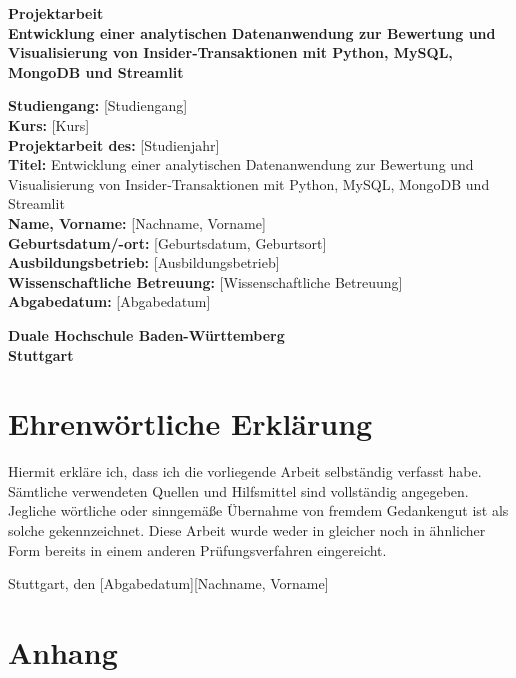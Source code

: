 \documentclass[a4paper,12pt]{article}
\newcommand{\makemercatorcover}{
  \begin{titlepage}
    \centering
    \vspace*{2cm}
    {\LARGE\textbf{Projektarbeit}}\\[1.5cm]
    {\Large\textbf{\placeholdertitle}}\\[3cm]
    \begin{flushleft}
    \textbf{Studiengang:} \placeholderstudiengang\\[0.5cm]
    \textbf{Kurs:} \placeholderkurs\\[0.5cm]
    \textbf{Projektarbeit des:} \placeholderstudienjahr\\[0.5cm]
    \textbf{Titel:} \placeholdertitle\\[0.5cm]
    \textbf{Name, Vorname:} \placeholdername\\[0.5cm]
    \textbf{Geburtsdatum/-ort:} \placeholderbirth\\[0.5cm]
    \textbf{Ausbildungsbetrieb:} \placeholdercompany\\[0.5cm]
    \textbf{Wissenschaftliche Betreuung:} \placeholderadvisor\\[0.5cm]
    \textbf{Abgabedatum:} \placeholderdate
    \end{flushleft}
    \vfill
    \textbf{Duale Hochschule Baden-Württemberg}\\[0.3cm]
    \textbf{Stuttgart}
    \vspace*{1cm}
  \end{titlepage}
}
\newcommand{\placeholdertitle}{Entwicklung einer analytischen Datenanwendung zur Bewertung und Visualisierung von Insider‑Transaktionen mit Python, MySQL, MongoDB und Streamlit}
\newcommand{\placeholderstudiengang}{[Studiengang]}
\newcommand{\placeholderkurs}{[Kurs]}
\newcommand{\placeholderstudienjahr}{[Studienjahr]}
\newcommand{\placeholdername}{[Nachname, Vorname]}
\newcommand{\placeholderbirth}{[Geburtsdatum, Geburtsort]}
\newcommand{\placeholdercompany}{[Ausbildungsbetrieb]}
\newcommand{\placeholderadvisor}{[Wissenschaftliche Betreuung]}
\newcommand{\placeholderdate}{[Abgabedatum]}
\begin{document}
\makemercatorcover

\section*{Ehrenwörtliche Erklärung}
Hiermit erkläre ich, dass ich die vorliegende Arbeit selbständig verfasst habe. Sämtliche verwendeten Quellen und Hilfsmittel sind vollständig angegeben. Jegliche wörtliche oder sinngemäße Übernahme von fremdem Gedankengut ist als solche gekennzeichnet. Diese Arbeit wurde weder in gleicher noch in ähnlicher Form bereits in einem anderen Prüfungsverfahren eingereicht.
\vspace{2cm}

\noindent Stuttgart, den \placeholderdate \hfill \placeholdername

\clearpage

\tableofcontents
\clearpage










\appendix
\section*{Anhang}




\clearpage
\printbibliography
\end{document}
